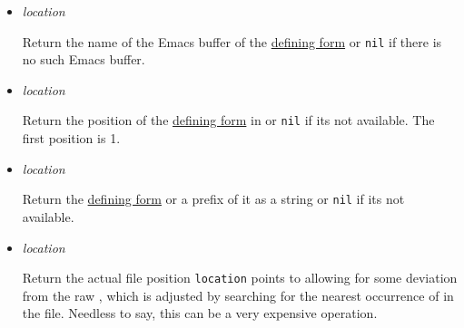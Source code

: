 \begin{itemize}
  Return the file position of the
  \href{http://www.lispworks.com/documentation/HyperSpec/Body/26_glo_d.htm\#defining_form}{defining
  form} or \texttt{nil} if it\textquotesingle s not available. The first
  position is 0.
\item
  \label{x-28DREF-EXT-3ASOURCE-LOCATION-BUFFER-20FUNCTION-29}
  \emph{location}

  Return the name of the Emacs buffer of the
  \href{http://www.lispworks.com/documentation/HyperSpec/Body/26_glo_d.htm\#defining_form}{defining
  form} or \texttt{nil} if there is no such Emacs buffer.
\item
  \label{x-28DREF-EXT-3ASOURCE-LOCATION-BUFFER-POSITION-20FUNCTION-29}
  \emph{location}

  Return the position of the
  \href{http://www.lispworks.com/documentation/HyperSpec/Body/26_glo_d.htm\#defining_form}{defining
  form} in
  or \texttt{nil} if it\textquotesingle s not available. The first
  position is 1.
\item
  \label{x-28DREF-EXT-3ASOURCE-LOCATION-SNIPPET-20FUNCTION-29}
  \emph{location}

  Return the
  \href{http://www.lispworks.com/documentation/HyperSpec/Body/26_glo_d.htm\#defining_form}{defining
  form} or a prefix of it as a string or \texttt{nil} if
  it\textquotesingle s not available.
\item
  \label{x-28DREF-EXT-3ASOURCE-LOCATION-ADJUSTED-FILE-POSITION-20FUNCTION-29}
  \emph{location}

  Return the actual file position \texttt{location} points to allowing
  for some deviation from the raw
  ,
  which is adjusted by searching for the nearest occurrence of
  in the file. Needless to say, this can be a very expensive operation.


\end{itemize}
